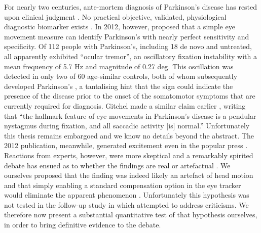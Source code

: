 \documentclass[jou,a4paper]{apa6}
\begin{document}
For nearly two centuries, ante-mortem diagnosis of Parkinson's disease has rested upon clinical judgment \citep{Hughes1992Accuracy-of-cli}. No practical objective, validated, physiological diagnostic biomarker exists \citep{Sharma2013Biomarkers-in-P}. In 2012, however, \citeauthor{Gitchel2012Pervasive-ocula} proposed that a simple eye movement measure can identify Parkinson's with nearly perfect sensitivity and specificity. Of 112 people with Parkinson's, including 18 de novo and untreated, all apparently exhibited ``ocular tremor'', an oscillatory fixation instability with a mean frequency of 5.7 Hz and magnitude of 0.27 deg. This oscillation was detected in only two of 60 age-similar controls, both of whom subsequently developed Parkinson's \citep{Gitchel2014Experimental-su}, a tantalising hint that the sign could indicate the presence of the disease prior to the onset of the somatomotor symptoms that are currently required for diagnosis.
Gitchel made a similar claim earlier \citeyearpar{Gitchel2009Oculomotor-cont}, writing that ``the hallmark feature of eye movements in Parkinson's disease is a pendular nystagmus during fixation, and all saccadic activity [is] normal.'' Unfortunately this thesis remains embargoed and we know no details beyond the abstract. The 2012 publication, meanwhile, generated excitement even in the popular press \citep{In-Brief2012Ocular-Tremor-i,Phend2012Eye-tremors-may}. Reactions from experts, however, were more skeptical and a remarkably spirited debate has ensued as to whether the findings are real or artefactual \citep{Baron2013Ocular-tremor-i,Baron2014Scientific-data,Bronstein2014EYEE:-exciting-,Duval2013Ocular-tremor-i,Gitchel2014Experimental-su,Kaski2013Eye-oscillation,Kaski2013Ocular-tremor-i,Leigh2013Tremor-of-the-e,MacAskill2013Ocular-Tremor-i,Saifee2014Tremor-of-the-e,Willard2014Ocular-motor-di}. We ourselves proposed that the finding was indeed likely an artefact of head motion and that simply enabling a standard compensation option in the eye tracker would eliminate the apparent phenomenon \citep{MacAskill2013Ocular-Tremor-i}. Unfortunately this hypothesis was not tested in the follow-up study in which \citet{Gitchel2014Experimental-su} attempted to address criticisms. We therefore now present a substantial quantitative test of that hypothesis ourselves, in order to bring definitive evidence to the debate.
\end{document}
